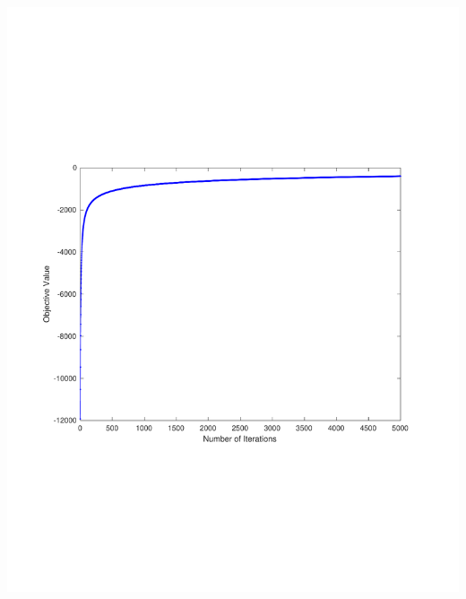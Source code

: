 \documentclass[11pt]{article}
\begin{document}
\begin{enumerate}
\begin{enumerate}
		\includegraphics[scale=.5]{obj.pdf}
		

\end{enumerate}
\end{enumerate}
\end{document}

